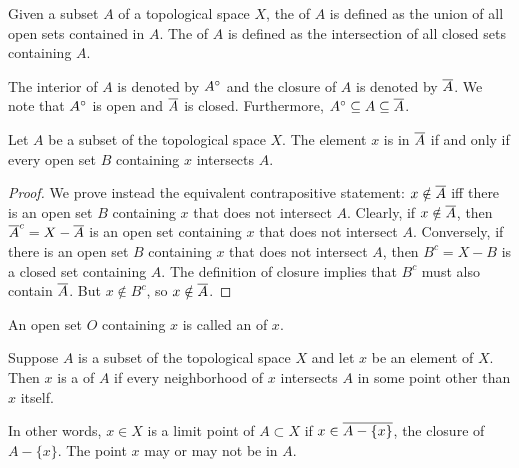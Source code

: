 \begin{definition}
Given a subset $A$ of a topological space $X$, the  of $A$ is defined as the union of all open sets contained in $A$.
The  of $A$ is defined as the intersection of all closed sets containing $A$.
\end{definition}

The interior of $A$ is denoted by ${A}^{\circ}$ and the closure of $A$ is denoted by $\overline{A}$.
We note that ${A}^{\circ}$ is open and $\overline{A}$ is closed.
Furthermore, ${A}^{\circ} \subseteq A \subseteq \overline{A}$.

\begin{theorem} \label{theorem:ClosureConditions}
Let $A$ be a subset of the topological space $X$.
The element $x$ is in $\overline{A}$ if and only if every open set $B$ containing $x$ intersects $A$.
\end{theorem}
\begin{proof}
We prove instead the equivalent contrapositive statement: $x \notin \overline{A}$ iff there is an open set $B$ containing $x$ that does not intersect $A$.
Clearly, if  $x \notin \overline{A}$, then $\overline{A}^c = X - \overline{A}$ is an open set containing $x$ that does not intersect $A$.
Conversely, if there is an open set $B$ containing $x$ that does not intersect $A$, then $B^c = X-B$ is a closed set containing $A$.
The definition of closure implies that $B^c$ must also contain $\overline{A}$.
But $x \notin B^c$, so $x\notin \overline{A}$.
\end{proof}

\begin{definition}
An open set $O$ containing $x$ is called an  of $x$.
\end{definition}

\begin{definition}
Suppose $A$ is a subset of the topological space $X$ and let $x$ be an element of $X$.
Then $x$ is a  of $A$ if every neighborhood of $x$ intersects $A$ in some point other than $x$ itself.
\end{definition}

In other words, $x \in X$ is a limit point of $A \subset X$ if $x \in \overline{A - \{ x \}}$, the closure of $A - \{ x \}$.
The point $x$ may or may not be in $A$.

